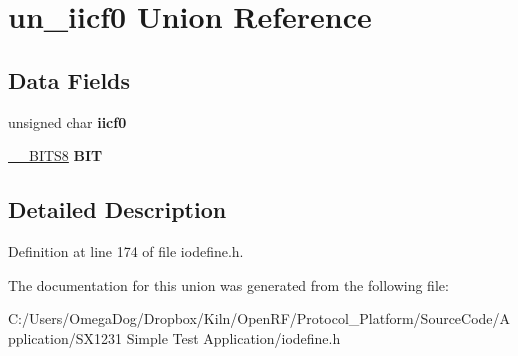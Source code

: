 \hypertarget{unionun__iicf0}{\section{un\-\_\-iicf0 Union Reference}
\label{unionun__iicf0}
}
\subsection*{Data Fields}
\begin{DoxyCompactItemize}
\item 
\hypertarget{unionun__iicf0_a7c9b37f2b6e99766bb56f9d0b30065a7}{unsigned char {\bfseries iicf0}}\label{unionun__iicf0_a7c9b37f2b6e99766bb56f9d0b30065a7}

\item 
\hypertarget{unionun__iicf0_a22a262fe91006757d2c34650af9d70fa}{\hyperlink{struct_____b_i_t_s8}{\-\_\-\-\_\-\-B\-I\-T\-S8} {\bfseries B\-I\-T}}\label{unionun__iicf0_a22a262fe91006757d2c34650af9d70fa}

\end{DoxyCompactItemize}


\subsection{Detailed Description}


Definition at line 174 of file iodefine.\-h.



The documentation for this union was generated from the following file\-:\begin{DoxyCompactItemize}
\item 
C\-:/\-Users/\-Omega\-Dog/\-Dropbox/\-Kiln/\-Open\-R\-F/\-Protocol\-\_\-\-Platform/\-Source\-Code/\-Application/\-S\-X1231 Simple Test Application/iodefine.\-h\end{DoxyCompactItemize}
